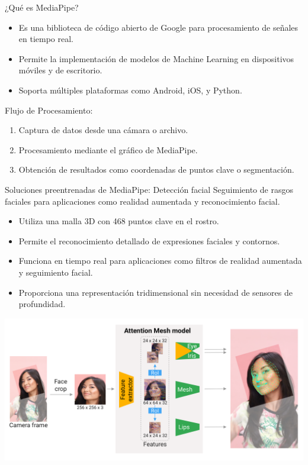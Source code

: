 
\begin{frame}{¿Qué es MediaPipe?}
    \begin{itemize}
        \item Es una biblioteca de código abierto de Google para procesamiento de señales en tiempo real.
        \item Permite la implementación de modelos de Machine Learning en dispositivos móviles y de escritorio.
        \item Soporta múltiples plataformas como Android, iOS, y Python.
    \end{itemize}
    Flujo de Procesamiento:
    \begin{enumerate}
        \item Captura de datos desde una cámara o archivo.
        \item Procesamiento mediante el gráfico de MediaPipe.
        \item Obtención de resultados como coordenadas de puntos clave o segmentación.
    \end{enumerate}

\end{frame}

\begin{frame}{Soluciones preentrenadas de MediaPipe: Detección facial}
    Seguimiento de rasgos faciales para aplicaciones como realidad aumentada y reconocimiento facial.
     \begin{itemize}
        \item Utiliza una malla 3D con 468 puntos clave en el rostro.
        \item Permite el reconocimiento detallado de expresiones faciales y contornos.
        \item Funciona en tiempo real para aplicaciones como filtros de realidad aumentada y seguimiento facial.
        \item Proporciona una representación tridimensional sin necesidad de sensores de profundidad.
    \end{itemize}
    \begin{center}
        \includegraphics[width=0.6\linewidth]{01_MediaPipe/fase_mesh_detection.png}
    \end{center}
\end{frame}

